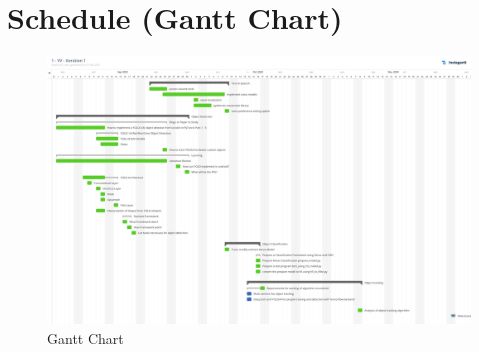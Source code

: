     \section{Schedule (Gantt Chart)}
        \begin{figure}[h]
                \centering
                \includegraphics[width=1.0\textwidth]{img/gantt_chart.jpeg}
                \caption{Gantt Chart}
                \label{fig:Gantt Chart}
            \end{figure}